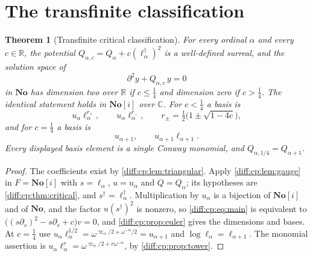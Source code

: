 \documentclass[11pt,letterpaper]{article}
\numberwithin{equation}{section}
\newtheorem{theorem}{Theorem}[section]
\theoremstyle{definition}
\theoremstyle{remark}
\newcommand{\No}{\mathbf{No}}
\newcommand{\SC}{\mathbf{No}[i]}
\newcommand{\R}{\mathbb R}
\newcommand{\C}{\mathbb C}
\newcommand{\der}{\partial}
\begin{document}
\section{The transfinite classification}
\label{diff:cp:sec:classification}

\begin{theorem}[Transfinite critical classification]
\label{diff:cp:thm:main}
For every ordinal $\alpha$ and every $c\in\R$, the potential
$Q_{\alpha,c}=Q_{\alpha}+c(\ell_{\alpha}^{\dagger})^{2}$ is a well-defined
surreal, and the solution space of
\begin{equation}\label{diff:cp:eq:main}
 \der^{2}y+Q_{\alpha,c}\,y=0
\end{equation}
in $\No$ has dimension two over $\R$ if $c\leq\frac14$ and dimension zero if
$c>\frac14$. The identical statement holds in $\SC$ over $\C$. For $c<\frac14$
a basis is
\begin{equation}\label{diff:cp:eq:basissub}
 u_{\alpha}\ell_{\alpha}^{r_{+}},\qquad u_{\alpha}\ell_{\alpha}^{r_{-}},
 \qquad r_{\pm}=\tfrac12\bigl(1\pm\sqrt{1-4c}\bigr),
\end{equation}
and for $c=\frac14$ a basis is
\begin{equation}\label{diff:cp:eq:basiscrit}
 u_{\alpha+1},\qquad u_{\alpha+1}\ell_{\alpha+1}.
\end{equation}
Every displayed basis element is a single Conway monomial, and
$Q_{\alpha,1/4}=Q_{\alpha+1}$.
\end{theorem}
\begin{proof}
The coefficients exist by \cref{diff:cp:lem:triangular}. Apply
\cref{diff:cp:lem:gauge} in $F=\SC$ with $s=\ell_{\alpha}$, $u=u_{\alpha}$ and
$Q=Q_{\alpha}$; its hypotheses are \cref{diff:cp:thm:critical}, and
$s^{\dagger}=\ell_{\alpha}^{\dagger}$. Multiplication by $u_{\alpha}$ is a
bijection of $\SC$ and of $\No$, and the factor $u(s^{\dagger})^{2}$ is nonzero,
so \cref{diff:cp:eq:main} is equivalent to
$\bigl((s\der_{s})^{2}-s\der_{s}+c\bigr)v=0$, and
\cref{diff:cp:prop:euler} gives the dimensions and bases. At $c=\frac14$ use
$u_{\alpha}\ell_{\alpha}^{1/2}=\omega^{\varpi_{\alpha}/2+\omega^{-\alpha}/2}=u_{\alpha+1}$
and $\log\ell_{\alpha}=\ell_{\alpha+1}$. The monomial assertion is
$u_{\alpha}\ell_{\alpha}^{r}=\omega^{\varpi_{\alpha}/2+r\omega^{-\alpha}}$, by
\cref{diff:cp:prop:tower}.
\end{proof}
\end{document}
